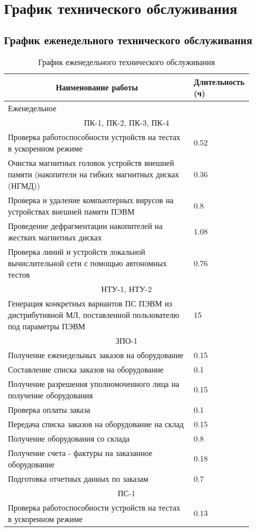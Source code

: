\documentclass[a4paper,14pt]{extarticle}
\begin{document}
\section*{График технического обслуживания}

\subsection*{График еженедельного технического обслуживания}
	\begin{table}[htbp]
			\caption{График еженедельного технического обслуживания}
	\centering
	\small
	\begin{tabular}{|p{0.75\linewidth}|m{0.23\linewidth}|}
		\hline
		\multicolumn{1}{|c|}{Наименование работы} & Длительность (ч) \\ \hline
		\multicolumn{ 2}{|l|}{Еженедельное} \\ \hline
		\multicolumn{ 2}{|c|}{ПК-1, ПК-2, ПК-3, ПК-4} \\ \hline
		Проверка работоспособности устройств на тестах в ускоренном режиме  & 0.52 \\ \hline
		Очистка магнитных головок устройств внешней памяти (накопители на гибких магнитных дисках (НГМД))  & 0.36 \\ \hline
		Проверка и удаление компьютерных вирусов на устройствах внешней памяти ПЭВМ  & 0.8 \\ \hline
		Проведение дефрагментации накопителей на жестких магнитных дисках  & 1.08 \\ \hline
		Проверка линий и устройств локальной вычислительной сети с помощью автономных тестов  & 0.76 \\ \hline
		\multicolumn{ 2}{|c|}{НТУ-1, НТУ-2} \\ \hline
		Генерация конкретных вариантов ПС ПЭВМ из дистрибутивной МЛ, поставленной пользователю под параметры ПЭВМ & 15 \\ \hline
		\multicolumn{ 2}{|c|}{ЗПО-1} \\ \hline
		Получение еженедельных заказов на оборудование  & 0.15 \\ \hline
		Составление списка заказов на оборудование  & 0.1 \\ \hline
		Получение разрешения уполномоченного лица на получение оборудования  & 0.15 \\ \hline
		Проверка оплаты заказа  & 0.1 \\ \hline
		Передача списка заказов на оборудование на склад  & 0.15 \\ \hline
		Получение оборудования со склада  & 0.8 \\ \hline
		Получение счета - фактуры на заказанное оборудование  & 0.18 \\ \hline
		Подготовка отчетных данных по заказам  & 0.7 \\ \hline
		\multicolumn{ 2}{|c|}{ПС-1} \\ \hline
		Проверка работоспособности устройств на тестах в ускоренном режиме & 0.13 \\ \hline
	\end{tabular}

	\label{tab:week}
\end{table}
\newpage
\end{document}
